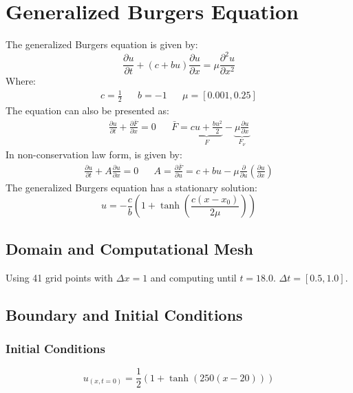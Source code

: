 \documentclass[11pt, a4paper]{article}
\begin{document}
\section{Generalized Burgers Equation}
The generalized Burgers equation is given by:
\begin{equation}
    \frac{\partial u}{\partial t}+\left(c+bu\right)\frac{\partial u}{\partial x}=\mu\frac{\partial^2u}{\partial x^2}
\end{equation}
Where:
\begin{equation*}
    \begin{matrix}
        c=\frac{1}{2} && b=-1 && \mu=\left[0.001, 0.25\right]
    \end{matrix}
\end{equation*}
The equation can also be presented as:
\begin{equation}
    \begin{matrix}
        \displaystyle\frac{\partial u}{\partial t}+\frac{\partial\bar{F}}{\partial x}=0 && \bar{F}=\underbrace{cu+\frac{bu^2}{2}}_F-\underbrace{\mu\frac{\partial u}{\partial x}}_{F_\nu}
    \end{matrix}
\end{equation}
In non-conservation law form, is given by:
\begin{equation}
    \begin{matrix}
        \displaystyle\frac{\partial u}{\partial t}+A\frac{\partial u}{\partial x}=0 && \displaystyle A=\frac{\partial\bar{F}}{\partial u}=c+bu-\mu\frac{\partial}{\partial u}\left(\frac{\partial u}{\partial x}\right)
    \end{matrix}
\end{equation}
The generalized Burgers equation has a stationary solution:
\begin{equation}
    u=-\frac{c}{b}\left(1+\tanh{\left(\displaystyle\frac{c\left(x-x_0\right)}{2\mu}\right)}\right)
\end{equation}

\subsection{Domain and Computational Mesh}
Using 41 grid points with $\Delta x=1$ and computing until $t=18.0$. $\Delta t=\left[0.5, 1.0\right]$.

\subsection{Boundary and Initial Conditions}
\subsubsection{Initial Conditions}
\begin{equation}
    u_{\left(x,t=0\right)}=\frac{1}{2}\left(1+\tanh\left(250\left(x-20\right)\right)\right)
\end{equation}
\end{document}

